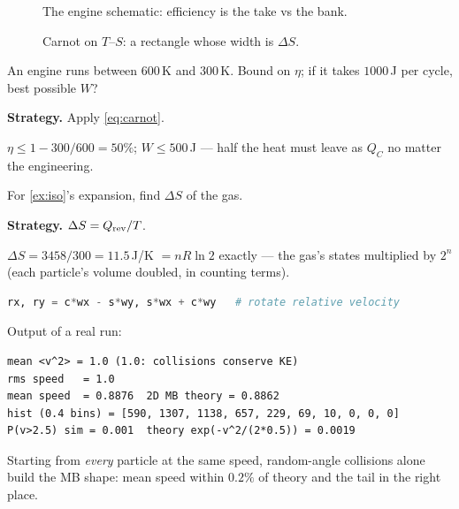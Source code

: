 \begin{figure}[htbp]\centering

\caption{The engine schematic: efficiency is the take vs the bank.}
\label{fig:engine}
\end{figure}

\begin{figure}[htbp]\centering

\caption{Carnot on $T$--$S$: a rectangle whose width is $\Delta S$.}
\label{fig:ts}
\end{figure}

\begin{example}\label{ex:carnot}
An engine runs between $600$\,K and $300$\,K. Bound on $\eta$; if it
takes $1000$\,J per cycle, best possible $W$?
\par\smallskip
\textbf{Strategy.} Apply \eqref{eq:carnot}.
\begin{solution}
$\eta\le1-300/600=50\%$; $W\le500$\,J --- half the heat must leave as
$Q_C$ no matter the engineering. \checkmark
\end{solution}
\end{example}

\begin{example}\label{ex:entropy}
For \ref{ex:iso}'s expansion, find $\Delta S$ of the gas.
\par\smallskip
\textbf{Strategy.} $\Delta S=Q_{\rm rev}/T$.
\begin{solution}
$\Delta S=3458/300=11.5$\,J/K $=nR\ln2$ exactly --- the gas's states
multiplied by $2^{n}$ (each particle's volume doubled, in counting
terms). \checkmark
\end{solution}
\end{example}

\begin{lstlisting}[language=Python,caption={\texttt{code/ch17\_maxwell\_boltzmann.py} --- Kac-model thermalisation vs 2-D MB theory.},label={lst:mb}]
rx, ry = c*wx - s*wy, s*wx + c*wy   # rotate relative velocity
\end{lstlisting}

Output of a real run:
\begin{lstlisting}[numbers=none]
mean <v^2> = 1.0 (1.0: collisions conserve KE)
rms speed   = 1.0
mean speed  = 0.8876  2D MB theory = 0.8862
hist (0.4 bins) = [590, 1307, 1138, 657, 229, 69, 10, 0, 0, 0]
P(v>2.5) sim = 0.001  theory exp(-v^2/(2*0.5)) = 0.0019
\end{lstlisting}

Starting from \emph{every} particle at the same speed, random-angle
collisions alone build the MB shape: mean speed within $0.2\%$ of
theory and the tail in the right place.


